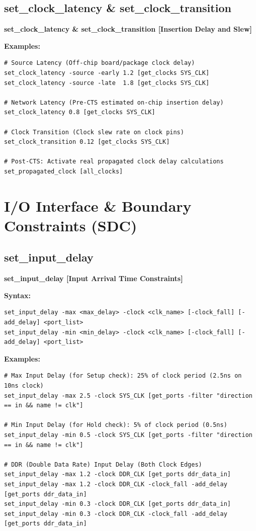 \documentclass[11pt,a4paper]{article}
\newenvironment{cmdbox}[2]{%
  \begin{mdframed}[style=cmdstyle]%
  {\bfseries\sffamily\color{primary}#1 \hfill \footnotesize\color{mutedgray}[#2]}\par\vspace{3pt}%
}{%
  \end{mdframed}%
}
\begin{document}
\subsection{set\_clock\_latency \& set\_clock\_transition}
\begin{cmdbox}{set\_clock\_latency \& set\_clock\_transition}{Insertion Delay and Slew}
\textbf{Examples:}
\begin{lstlisting}[style=sdcstyle]
# Source Latency (Off-chip board/package clock delay)
set_clock_latency -source -early 1.2 [get_clocks SYS_CLK]
set_clock_latency -source -late  1.8 [get_clocks SYS_CLK]

# Network Latency (Pre-CTS estimated on-chip insertion delay)
set_clock_latency 0.8 [get_clocks SYS_CLK]

# Clock Transition (Clock slew rate on clock pins)
set_clock_transition 0.12 [get_clocks SYS_CLK]

# Post-CTS: Activate real propagated clock delay calculations
set_propagated_clock [all_clocks]
\end{lstlisting}
\end{cmdbox}

\section{I/O Interface \& Boundary Constraints (SDC)}

\subsection{set\_input\_delay}
\begin{cmdbox}{set\_input\_delay}{Input Arrival Time Constraints}
\textbf{Syntax:}
\begin{lstlisting}[style=sdcstyle]
set_input_delay -max <max_delay> -clock <clk_name> [-clock_fall] [-add_delay] <port_list>
set_input_delay -min <min_delay> -clock <clk_name> [-clock_fall] [-add_delay] <port_list>
\end{lstlisting}
\textbf{Examples:}
\begin{lstlisting}[style=sdcstyle]
# Max Input Delay (for Setup check): 25% of clock period (2.5ns on 10ns clock)
set_input_delay -max 2.5 -clock SYS_CLK [get_ports -filter "direction == in && name != clk"]

# Min Input Delay (for Hold check): 5% of clock period (0.5ns)
set_input_delay -min 0.5 -clock SYS_CLK [get_ports -filter "direction == in && name != clk"]

# DDR (Double Data Rate) Input Delay (Both Clock Edges)
set_input_delay -max 1.2 -clock DDR_CLK [get_ports ddr_data_in]
set_input_delay -max 1.2 -clock DDR_CLK -clock_fall -add_delay [get_ports ddr_data_in]
set_input_delay -min 0.3 -clock DDR_CLK [get_ports ddr_data_in]
set_input_delay -min 0.3 -clock DDR_CLK -clock_fall -add_delay [get_ports ddr_data_in]
\end{lstlisting}
\end{cmdbox}
\end{document}
